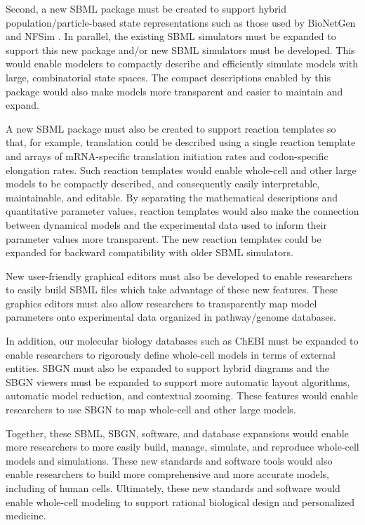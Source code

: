 \documentclass[journal,transmag]{IEEEtran}
\begin{document}
Second, a new SBML package must be created to support hybrid population/particle-based state representations such as those used by BioNetGen \cite{Hlavacek2006, Hogg2014} and NFSim \cite{Sneddon2011}. In parallel, the existing SBML simulators must be expanded to support this new package and/or new SBML simulators must be developed. This would enable modelers to compactly describe and efficiently simulate models with large, combinatorial state spaces. The compact descriptions enabled by this package would also make models more transparent and easier to maintain and expand. 

A new SBML package must also be created to support reaction templates so that, for example, translation could be described using a single reaction template and arrays of mRNA-specific translation initiation rates and codon-specific elongation rates. Such reaction templates would enable whole-cell and other large models to be compactly described, and consequently easily interpretable, maintainable, and editable. By separating the mathematical descriptions and quantitative parameter values, reaction templates would also make the connection between dynamical models and the experimental data used to inform their parameter values more transparent. The new reaction templates could be expanded for backward compatibility with older SBML simulators.

New user-friendly graphical editors must also be developed to enable researchers to easily build SBML files which take advantage of these new features. These graphics editors must also allow researchers to transparently map model parameters onto experimental data organized in pathway/genome databases.

In addition, our molecular biology databases such as ChEBI must be expanded to enable researchers to rigorously define whole-cell models in terms of external entities. SBGN must also be expanded to support hybrid diagrams and the SBGN viewers must be expanded to support more automatic layout algorithms, automatic model reduction, and contextual zooming. These features would enable researchers to use SBGN to map whole-cell and other large models.

Together, these SBML, SBGN, software, and database expansions would enable more researchers to more easily build, manage, simulate, and reproduce whole-cell models and simulations. These new standards and software tools would also enable researchers to build more comprehensive and more accurate models, including of human cells. Ultimately, these new standards and software would enable whole-cell modeling to support rational biological design and personalized medicine.
\end{document}
